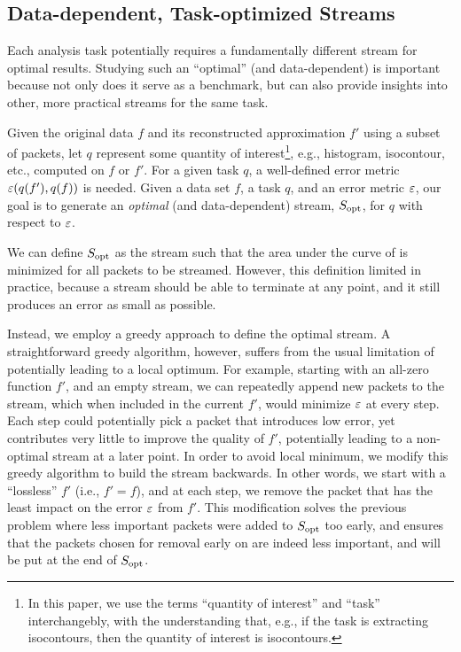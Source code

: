 \subsection{Data-dependent, Task-optimized Streams} \label{sec:data_dep_streams}


Each analysis task potentially requires a fundamentally different stream for
optimal results.  Studying such an ``optimal'' (and data-dependent) is
important because not only does it serve as a benchmark, but can also provide
insights into other, more practical streams for the same task.

Given the original data $f$ and its reconstructed approximation $f'$ using a
subset of packets, let $q$ represent some quantity of interest\footnote{In this
paper, we use the terms ``quantity of interest'' and ``task'' interchangebly,
with the understanding that, e.g., if the task is extracting isocontours, then
the quantity of interest is isocontours.}, e.g., histogram, isocontour, etc.,
computed on $f$ or $f'$. For a given task $q$, a well-defined error metric
$\err(q(f'),q(f))$ is needed. Given a data set $f$, a task $q$, and an error
metric $\err$, our goal is to generate an \emph{optimal} (and data-dependent)
stream, $\sopt$, for $q$ with respect to $\err$.

We can define $\sopt$ as the stream such that the area under the curve of \err
is minimized for all packets to be streamed. However, this definition limited
in practice, because a stream should be able to terminate at any point, and it
still produces an error as small as possible. 

Instead, we employ a greedy approach to define the optimal stream.  A
straightforward greedy algorithm, however, suffers from the usual limitation of
potentially leading to a local optimum. For example, starting with an all-zero
function $f'$, and an empty stream, we can repeatedly append new packets to the
stream, which when included in the current $f'$, would minimize $\err$ at every
step. Each step could potentially pick a packet that introduces low error, yet
contributes very little to improve the quality of $f'$, potentially leading to
a non-optimal stream at a later point.  In order to avoid local minimum, we
modify this greedy algorithm to build the stream backwards. In other words, we
start with a ``lossless'' $f'$ (i.e., $f'=f$), and at each step, we remove the
packet that has the least impact on the error $\err$ from $f'$.  This
modification solves the previous problem where less important packets were
added to $\sopt$ too early, and ensures that the packets chosen for removal
early on are indeed less important, and will be put at the end of $\sopt$.

